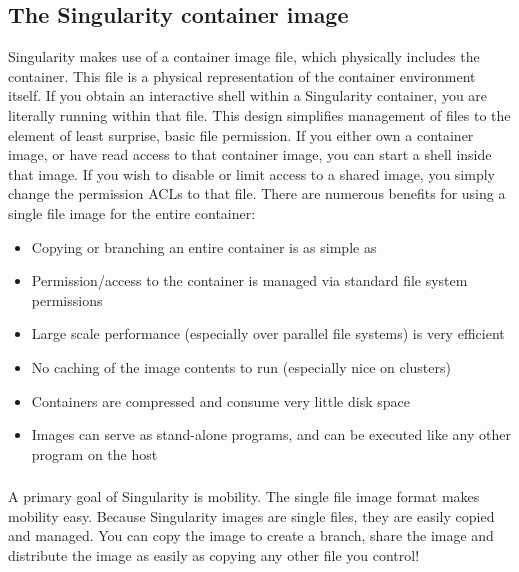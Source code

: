 \documentclass[letterpaper,10pt,english]{sphinxmanual}
\begin{document}
\subsection{The Singularity container image}
\label{\detokenize{introduction:the-singularity-container-image}}
Singularity makes use of a container image
file, which physically includes the container. This file is a physical
representation of the container environment itself. If you obtain an
interactive shell within a Singularity container, you are literally
running within that file.
This design simplifies management of files to the element of least surprise,
basic file permission. If you either own a container image, or have
read access to that container image, you can start a shell inside that
image. If you wish to disable or limit access to a shared image, you
simply change the permission ACLs to that file.
There are numerous benefits for using a single file image for the
entire container:
\begin{itemize}
\item {} 
Copying or branching an entire container is as simple as 

\item {} 
Permission/access to the container is managed via standard file
system permissions

\item {} 
Large scale performance (especially over parallel file systems) is
very efficient

\item {} 
No caching of the image contents to run (especially nice on clusters)

\item {} 
Containers are compressed and consume very little disk space

\item {} 
Images can serve as stand-alone programs, and can be executed like
any other program on the host

\end{itemize}


\subsubsection{}
\label{\detokenize{introduction:copying-sharing-branching-and-distributing-your-image}}
A primary goal of Singularity is mobility. The single file image
format makes mobility easy. Because Singularity images are single
files, they are easily copied and managed. You can copy the image to
create a branch, share the image and distribute the image as easily as
copying any other file you control!
\end{document}
